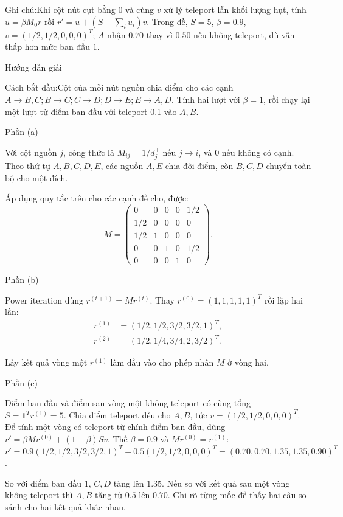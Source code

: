 \documentclass[10pt,a4paper,twocolumn]{article}
\makeatletter
\newcommand{\maptag}[1]{\phantomsection\@bsphack\protected@write\@auxout{}{\string\newlabel{#1}{{}{\thepage}{}{\@currentHref}{}}}\@esphack}
\newcommand{\key}[1]{#1:\enspace}
\newcommand{\solutionprompt}[1]{\par\addvspace{1pt}\noindent\key{Cách bắt đầu}#1\par\addvspace{2pt}}
\newcommand{\examnote}[1]{\par\addvspace{2pt}\noindent\key{Ghi chú}#1\par\addvspace{3pt}}
\newcommand{\blocklabel}[1]{\par\noindent#1\par\nobreak}
\newcommand{\answer}[1]{%
  \par\addvspace{3pt}%
  \blocklabel{#1Hướng dẫn giải}}
\newcommand{\guidepart}[1]{%
  \par\addvspace{1.5pt}%
  \blocklabel{Phần #1}}
\makeatother
\begin{document}
\examnote{Khi cột nút cụt bằng 0 và cùng $v$ xử lý teleport lẫn khối lượng hụt, tính $u=\beta M_0r$ rồi $r'=u+(S-\sum_i u_i)v$. Trong đề, $S=5$, $\beta=0.9$, $v=(1/2,1/2,0,0,0)^T$; $A$ nhận $0.70$ thay vì $0.50$ nếu không teleport, dù vẫn thấp hơn mức ban đầu $1$.}
\answer{\maptag{answer:A2-Q2}\maptag{answer:P24-Q5}}
\solutionprompt{Cột của mỗi nút nguồn chia điểm cho các cạnh $A\to B,C; B\to C; C\to D; D\to E; E\to A,D$. Tính hai lượt với $\beta=1$, rồi chạy lại một lượt từ điểm ban đầu với teleport 0.1 vào $A,B$.}
\guidepart{(a)}
\begin{guidesteps}
\item Với cột nguồn $j$, công thức là $M_{ij}=1/d_j^+$ nếu $j\to i$, và 0 nếu không có cạnh. Theo thứ tự $A,B,C,D,E$, các nguồn $A,E$ chia đôi điểm, còn $B,C,D$ chuyển toàn bộ cho một đích.
\item Áp dụng quy tắc trên cho các cạnh đề cho, được:
\[
M=\begin{pmatrix}0&0&0&0&1/2\\1/2&0&0&0&0\\1/2&1&0&0&0\\0&0&1&0&1/2\\0&0&0&1&0\end{pmatrix}.
\]
\end{guidesteps}
\guidepart{(b)}
\begin{guidesteps}
\item Power iteration dùng $r^{(t+1)}=Mr^{(t)}$. Thay $r^{(0)}=(1,1,1,1,1)^T$ rồi lặp hai lần:
\[
\begin{aligned}
r^{(1)}&=(1/2,1/2,3/2,3/2,1)^T,\\
r^{(2)}&=(1/2,1/4,3/4,2,3/2)^T.
\end{aligned}
\]
\item Lấy kết quả vòng một $r^{(1)}$ làm đầu vào cho phép nhân $M$ ở vòng hai.
\end{guidesteps}
\guidepart{(c)}
\begin{guidesteps}
\item Điểm ban đầu và điểm sau vòng một không teleport có cùng tổng $S=\mathbf1^Tr^{(1)}=5$. Chia điểm teleport đều cho $A,B$, tức $v=(1/2,1/2,0,0,0)^T$. Để tính một vòng có teleport từ chính điểm ban đầu, dùng $r'=\beta Mr^{(0)}+(1-\beta)Sv$. Thế $\beta=0.9$ và $Mr^{(0)}=r^{(1)}$: $r' =0.9(1/2,1/2,3/2,3/2,1)^T+0.5(1/2,1/2,0,0,0)^T=(0.70,0.70,1.35,1.35,0.90)^T$.
\item So với điểm ban đầu 1, $C,D$ tăng lên $1.35$. Nếu so với kết quả sau một vòng không teleport thì $A,B$ tăng từ $0.5$ lên $0.70$. Ghi rõ từng mốc để thấy hai câu so sánh cho hai kết quả khác nhau.
\end{guidesteps}
\end{document}
